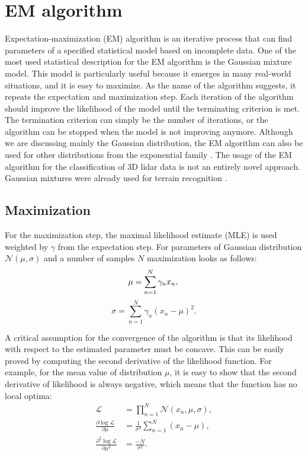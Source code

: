 \section{EM algorithm}
Expectation-maximization (EM) algorithm is an iterative process that can find parameters of a specified statistical model based on incomplete data. One of the most used statistical description for the EM algorithm is the Gaussian mixture model. This model is particularly useful because it emerges in many real-world situations, and it is easy to maximize. As the name of the algorithm suggests, it repeats the expectation and maximization step. Each iteration of the algorithm should improve the likelihood of the model until the terminating criterion is met. The termination criterion can simply be the number of iterations, or the algorithm can be stopped when the model is not improving anymore. Although we are discussing mainly the Gaussian distribution, the EM algorithm can also be used for other distributions from the exponential family \cite{dempster1977}. The usage of the EM algorithm for the classification of 3D lidar data is not an entirely novel approach. Gaussian mixtures were already used for terrain recognition \cite{lalonde2006}.
 
\subsection{Maximization}
For the maximization step, the maximal likelihood estimate (MLE) is used weighted by $\gamma$ from the expectation step. For parameters of Gaussian distribution $\mathcal{N}(\mu, \sigma)$ and a number of samples $N$ maximization looks as follows:
\begin{equation}
\mu = \sum_{n = 1}^{N} \gamma_n x_n, \\
\end{equation}
\begin{equation}
\sigma = \sum_{n = 1}^{N}\gamma_n (x_n - \mu)^2 .
\end{equation}

A critical assumption for the convergence of the algorithm is that its likelihood with respect to the estimated parameter must be concave. This can be easily proved by computing the second derivative of the likelihood function. For example, for the mean value of distribution  $\mu$, it is easy to show that the second derivative of likelihood is always negative, which means that the function has no local optima:
\begin{align}
\mathcal{L} &= \prod_{n=1}^N \mathcal{N}(x_n, \mu, \sigma), \nonumber \\
\frac{\partial \log \mathcal{L}}{\partial \mu} &= \frac{1}{\sigma^2} \sum_{n = 1}^{N} (x_n - \mu), \\
\frac{\partial^2 \log \mathcal{L}}{\partial \mu^2} &= \frac{-N}{\sigma^2}. \nonumber
\end{align}

